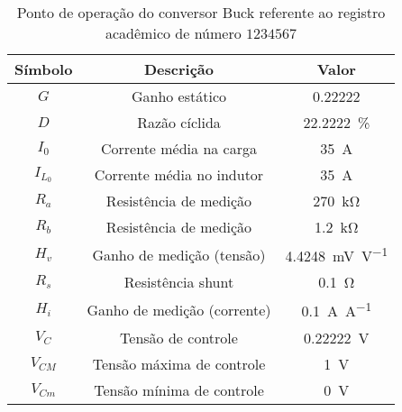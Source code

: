 \begin{table}[!ht]
\centering
\caption{Ponto de operação do conversor Buck referente ao registro acadêmico de número $1234567$}
\label{tab:steadystate}
\begin{tabular}{@{}ccc@{}}
\toprule
\textbf{Símbolo} & \textbf{Descrição} & \textbf{Valor}\\ \midrule
$G$ & Ganho estático & \SI{0.22222}{}\\
$D$ & Razão cíclida  & \SI{22.2222}{\%}\\
$I_0$ & Corrente média na carga  & \SI{35}{\A} \\
$I_{L_0}$ & Corrente média no indutor & \SI{35}{\A} \\
$R_a$ & Resistência de medição & \SI{270}{\kilo\ohm} \\
$R_b$ & Resistência de medição & \SI{1.2}{\kilo\ohm} \\
$H_v$ & Ganho de medição (tensão) & \SI{4.4248}{\milli\V\per\V} \\
$R_s$ & Resistência shunt & \SI{0.1}{\ohm} \\
$H_i$ & Ganho de medição (corrente) & \SI{0.1}{\A\per\A} \\
$V_C$ & Tensão de controle  & \SI{0.22222}{\V} \\
$V_{CM}$ & Tensão máxima de controle  & \SI{1}{\V} \\
$V_{Cm}$ & Tensão mínima de controle  & \SI{0}{\V} \\
\bottomrule
\end{tabular}
\end{table}

